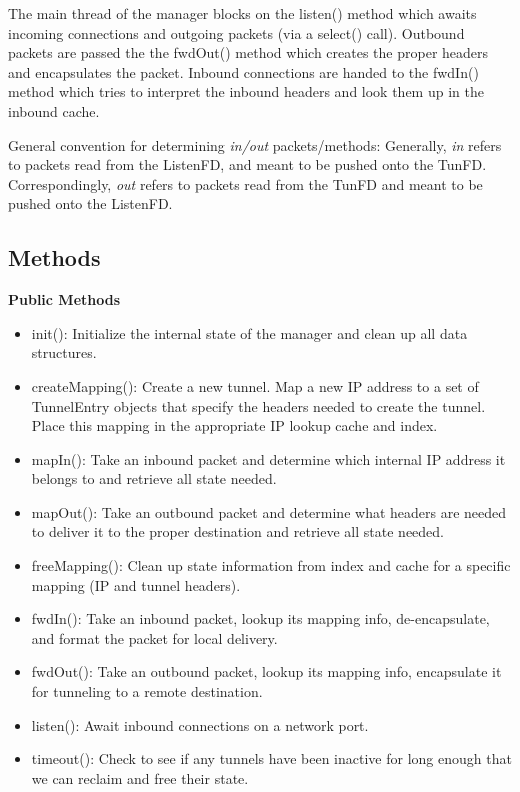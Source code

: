 The main thread of the manager blocks on the listen() method which awaits incoming connections and outgoing packets (via a
select() call).  Outbound packets are passed the the fwdOut() method which creates the proper headers and encapsulates the packet.  
Inbound connections are handed to the fwdIn() method which tries to interpret the inbound headers and look them up in the inbound cache.

General convention for determining \textit{in/out} packets/methods: Generally, \textit{in} refers to packets read from the ListenFD, and meant to be pushed onto the TunFD. Correspondingly, \textit{out} refers to packets read from the TunFD and meant to be pushed onto the ListenFD.

\subsection{Methods}

{\bf Public Methods}
\begin{itemize}
\item init(): Initialize the internal state of the manager and clean up all data structures.
\item createMapping(): Create a new tunnel.  Map a new IP address to a set of TunnelEntry objects that specify the headers needed to
create the tunnel.  Place this mapping in the appropriate IP lookup cache and index.
\item mapIn(): Take an inbound packet and determine which internal IP address it belongs to and retrieve all state needed.
\item mapOut(): Take an outbound packet and determine what headers are needed to deliver it to the proper destination and retrieve all
state needed.
\item freeMapping(): Clean up state information from index and cache for a specific mapping (IP and tunnel headers).
\item fwdIn(): Take an inbound packet, lookup its mapping info, de-encapsulate, and format the packet for local delivery.
\item fwdOut(): Take an outbound packet, lookup its mapping info, encapsulate it for tunneling to a remote destination.
\item listen(): Await inbound connections on a network port.
\item timeout(): Check to see if any tunnels have been inactive for long enough that we can reclaim and free their state.
\end{itemize}

